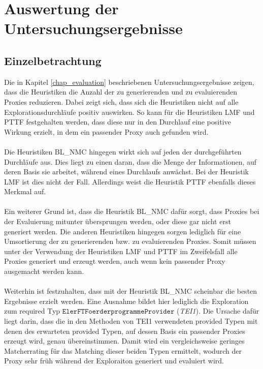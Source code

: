 \section{Auswertung der Untersuchungsergebnisse}
\subsection{Einzelbetrachtung}\label{disc_einzel}
Die in Kapitel \ref{chap_evaluation} beschriebenen Untersuchungsergebnisse zeigen, dass die Heuristiken die Anzahl der zu generierenden und zu evaluierenden Proxies reduzieren. Dabei zeigt sich, dass sich die Heuristiken nicht auf alle Explorationsdurchläufe positiv auswirken. So kann für die Heuristiken LMF und PTTF festgehalten werden, dass diese nur in den Durchlauf eine positive Wirkung erzielt, in dem ein passender Proxy auch gefunden wird.
\\\\
Die Heuristiken BL\_NMC hingegen wirkt sich auf jeden der durchgeführten Durchläufe aus. Dies liegt zu einen daran, dass die Menge der Informationen, auf deren Basis sie arbeitet, während eines Durchlaufs anwächst. Bei der Heuristik LMF ist dies nicht der Fall. Allerdings weist die Heuristik PTTF ebenfalls dieses Merkmal auf.
\\\\
Ein weiterer Grund ist, dass die Heuristik BL\_NMC dafür sorgt, dass Proxies bei der Evaluierung mitunter übersprungen werden, oder diese gar nicht erst generiert werden. Die anderen Heuristiken hingegen sorgen lediglich für eine Umsortierung der zu generierenden bzw. zu evaluierenden Proxies. Somit müssen unter der Verwendung der Heuristiken LMF und PTTF im Zweifelsfall alle Proxies generiert und erzeugt werden, auch wenn kein passender Proxy ausgemacht werden kann.
\\\\
Weiterhin ist festzuhalten, dass mit der Heuristik BL\_NMC scheinbar die besten Ergebnisse erzielt werden. Eine Ausnahme bildet hier lediglich die Exploration zum required Typ $\texttt{ElerFTFoerderprogrammeProvider}$ (\emph{TEI1}). Die Ursache dafür liegt darin, dass die in den Methoden von TEI1 verwendeten provided Typen mit denen des erwarteten provided Typen, auf dessen Basis ein passender Proxies erzeugt wird, genau übereinstimmen. Damit wird ein vergleichsweise geringes Matcherrating für das Matching dieser beiden Typen ermittelt, wodurch der Proxy sehr früh während der Exploraiton generiert und evaluiert wird.
